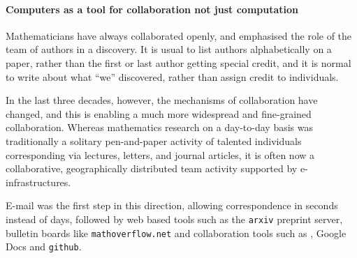 %
%

\paragraph{Computers as a tool for collaboration not just computation}

Mathematicians have always collaborated openly, and emphasised the
role of the team of authors in a discovery. It is usual to list
authors alphabetically on a paper, rather than the first or last
author getting special credit, and it is normal to write about what
``we'' discovered, rather than assign credit to individuals.

In the last three decades, however, the mechanisms of collaboration
have changed, and this is enabling a much more widespread and
fine-grained collaboration. Whereas mathematics research on a
day-to-day basis was traditionally a solitary pen-and-paper activity of
talented individuals corresponding via lectures, letters, and journal
articles, it is often now a collaborative, geographically distributed
team activity supported by e-infrastructures.

E-mail was the first step in this direction, allowing correspondence in
seconds instead of days, followed by web based tools such as the
\texttt{arxiv} preprint server, bulletin boards like
\texttt{mathoverflow.net} and collaboration tools such as \SMC, Google
Docs and \texttt{github}.




